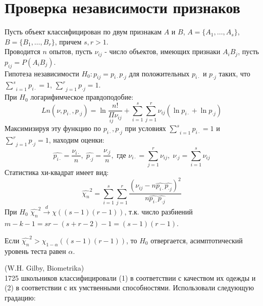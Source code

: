 \section{Проверка независимости признаков}\label{lec:8/sec:2}

Пусть объект классифицирован по двум признакам $A$ и $B$, $A = \{A_1, \dots, A_s\}$, $B = \{B_1, \dots, B_r\}$, причем $s,r > 1$.\\
Проводится $n$ опытов, пусть $\nu_{ij}$ - число объектов, имеющих признаки $A_i B_j$, пусть $p_{ij} = P(A_i B_j)$.\\

Гипотеза независимости $H_0: p_{ij} = p_{i\cdot} p_{\cdot j}$ для положительных $p_{i \cdot}$ и $p_{\cdot j}$ таких, что $\underset{i=1}{\overset{s}{\sum}}p_{i \cdot} = 1$, $\underset{j=1}{\overset{r}{\sum}}p_{\cdot j} = 1$.\\
При $H_0$ логарифимческое правдоподобие:
$$Ln (\nu, p_{i \cdot}, p_{\cdot j}) = \ln \frac{n!}{\underset{ij}{\Pi} \nu_{ij}} + \underset{i=1}{\overset{s}{\sum}}\underset{j=1}{\overset{r}{\sum}}\nu_{ij} (\ln p_{i \cdot} + \ln p_{\cdot j})$$
Максимизируя эту функцию по $p_{i \cdot}, p_{\cdot j}$ при условиях $\underset{i=1}{\overset{s}{\sum}}p_{i \cdot} = 1$ и $\underset{j=1}{\overset{r}{\sum}}p_{\cdot j} = 1$, находим оценки:
$$\hat{p_{i \cdot}} = \frac{\nu_{i \cdot}}{n}, \; \hat{p_{\cdot j}} = \frac{\nu_{\cdot j}}{n}, \text{ где } \nu_{i \cdot} = \underset{j=1}{\overset{r}{\sum}}\nu_{ij}, \; \nu_{\cdot j} = \underset{i=1}{\overset{s}{\sum}}\nu_{ij}$$
Статистика хи-квадрат имеет вид:
$$\hat{\chi_n}^2 = \underset{i=1}{\overset{s}{\sum}}\underset{j=1}{\overset{r}{\sum}}\frac{(\nu_{ij} - n \hat{p_{i \cdot}}\hat{p_{\cdot j}})^2}{n \hat{p_{i \cdot}}\hat{p_{\cdot j}}}$$
При $H_0$ $\hat{\chi_n}^2 \xrightarrow[]{d} \chi \left( (s-1)(r-1) \right)$, т.к. число разбиений $m-k-1 = s r - (s+r-2)-1 = (s-1)(r-1)$.

\begin{rulee}\label{lec:8/rule:2}
	Если $\hat{\chi_n}^2 > \chi_{1-\alpha} \left( (s-1)(r-1) \right)$, то $H_0$ отвергается, асимптотический уровень теста равен $\alpha$.
\end{rulee}

\textbf{} (W.H. Gilby, Biometrika)\\
1725 школьников классифицировали (1) в соответствии с качеством их одежды и (2) в соответствии с их умственными способностями. Использовали следующую градацию:

